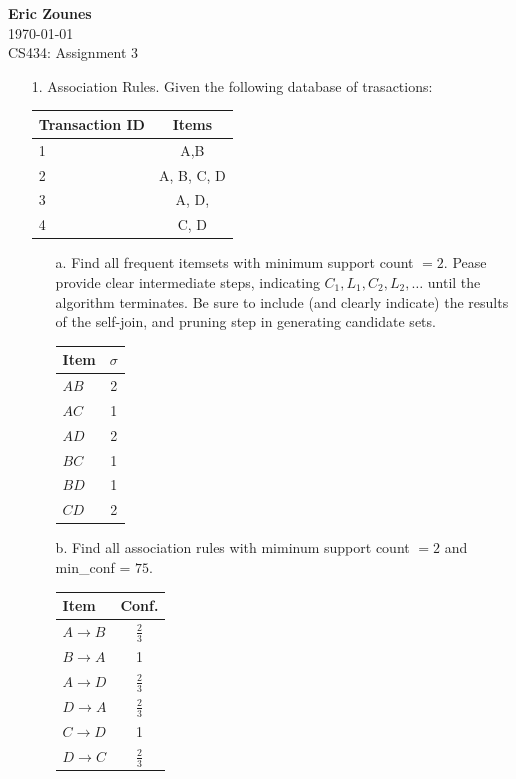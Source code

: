 \documentclass[12pt,letterpaper]{article}
\begin{document}
\setcounter{subsection}{2} 
\begin{flushright}
\end{flushright}
\begin{flushleft}
\textbf{Eric Zounes} \\
\today \\ 
CS434: Assignment 3
\end{flushleft}

\begin{enumerate} 
	\item[1.] Association Rules. Given the following database of trasactions: \\
	\begin{center}
	\begin{tabular}{| l | c |}   
		\hline
		Transaction ID & Items \\ \hline
		1 & A,B  \\ \hline
		2 & A, B, C, D  \\ \hline
		3 & A, D, \\ \hline
		4 & C, D \\ \hline 
	\end{tabular} 
	\end{center} 
	\begin{enumerate} 
		\item[a.] Find all frequent itemsets with minimum support count $= 2$. Pease provide clear intermediate steps, indicating $C_{1},L_{1},C_{2},L_{2}, \ldots$ until the algorithm terminates. Be sure to include (and clearly indicate) the results of the self-join, and pruning step in generating candidate sets. \\
	
		\begin{tabular}{| l | c |}   
		\hline
		Item & $\sigma$ \\ \hline
	   \cellcolor{green}$A B$ & 2  \\ \hline
		$A C$ & 1  \\ \hline
		\cellcolor{green}$A D$ & 2 \\ \hline
		$B C$ & 1 \\ \hline 
		$B D$ & 1 \\ \hline 
		\cellcolor{green}$C D$ & 2 \\ \hline 
		\end{tabular} 	
		
		\item[b.] Find all association rules with miminum support count $= 2$ and min\_conf = $75$.  \\
		\begin{tabular}{| l | c |}   
		\hline
		Item & Conf. \\ \hline
		$A \rightarrow B$ & $\frac{2}{3}$  \\ \hline
		\cellcolor{green}$B \rightarrow A$ & 1  \\ \hline
		$A \rightarrow D$ & $\frac{2}{3}$ \\ \hline
		$D \rightarrow A$ & $\frac{2}{3}$ \\ \hline 
		\cellcolor{green}$C \rightarrow D$ & 1 \\ \hline 
		$D \rightarrow C$ & $\frac{2}{3}$ \\ \hline 
		\end{tabular} 	
				

\end{enumerate}
\end{enumerate}
\end{document}
